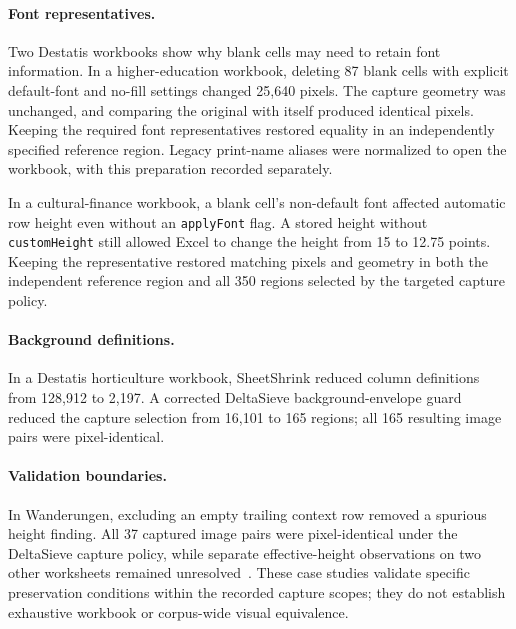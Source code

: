 \paragraph{Font representatives.}
Two Destatis workbooks show why blank cells may need to retain font information.
In a higher-education workbook, deleting 87 blank cells with explicit default-font
and no-fill settings changed 25,640 pixels. The capture geometry was unchanged,
and comparing the original with itself produced identical pixels. Keeping the
required font representatives restored equality in an independently specified
reference region. Legacy print-name aliases were normalized to open the workbook,
with this preparation recorded separately.

In a cultural-finance workbook, a blank cell's non-default font affected automatic
row height even without an \texttt{applyFont} flag. A stored height without
\texttt{customHeight} still allowed Excel to change the height from 15 to 12.75
points. Keeping the representative restored matching pixels and geometry in both
the independent reference region and all 350 regions selected by the targeted
capture policy.

\paragraph{Background definitions.}
In a Destatis horticulture workbook, SheetShrink reduced column definitions from
128,912 to 2,197. A corrected DeltaSieve background-envelope guard reduced the
capture selection from 16,101 to 165 regions; all 165 resulting image pairs were
pixel-identical.

\paragraph{Validation boundaries.}
In Wanderungen, excluding an empty trailing context row removed a spurious height
finding. All 37 captured image pairs were pixel-identical under the DeltaSieve
capture policy, while separate effective-height observations on two other worksheets
remained unresolved~\cite{trailingrowvalidation}.
These case studies validate specific preservation conditions within the recorded
capture scopes; they do not establish exhaustive workbook or corpus-wide visual
equivalence.

